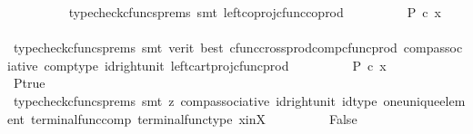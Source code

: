 \begin{isabellebody}
\ \ \ \ \ \ \ \ \isamarkupfalse%
\ {\isacharparenleft}{\kern0pt}typecheck{\isacharunderscore}{\kern0pt}cfuncs{\isacharunderscore}{\kern0pt}prems{\isacharcomma}{\kern0pt}\ smt\ left{\isacharunderscore}{\kern0pt}coproj{\isacharunderscore}{\kern0pt}cfunc{\isacharunderscore}{\kern0pt}coprod{\isacharparenright}{\kern0pt}\isanewline
\ \ \ \ \ \ \isamarkupfalse%
\ \isamarkupfalse%
\ {\isachardoublequoteopen}P\ {\isasymcirc}\isactrlsub c\ x\ {\isacharequal}{\kern0pt}\ {\isasymf}{\isachardoublequoteclose}\isanewline
\ \ \ \ \ \ \ \ \isamarkupfalse%
\ {\isacharparenleft}{\kern0pt}typecheck{\isacharunderscore}{\kern0pt}cfuncs{\isacharunderscore}{\kern0pt}prems{\isacharcomma}{\kern0pt}\ smt\ {\isacharparenleft}{\kern0pt}verit{\isacharcomma}{\kern0pt}\ best{\isacharparenright}{\kern0pt}\ cfunc{\isacharunderscore}{\kern0pt}cross{\isacharunderscore}{\kern0pt}prod{\isacharunderscore}{\kern0pt}comp{\isacharunderscore}{\kern0pt}cfunc{\isacharunderscore}{\kern0pt}prod\ comp{\isacharunderscore}{\kern0pt}associative{}\ comp{\isacharunderscore}{\kern0pt}type\ id{\isacharunderscore}{\kern0pt}right{\isacharunderscore}{\kern0pt}unit{}\ left{\isacharunderscore}{\kern0pt}cart{\isacharunderscore}{\kern0pt}proj{\isacharunderscore}{\kern0pt}cfunc{\isacharunderscore}{\kern0pt}prod{\isacharparenright}{\kern0pt}\isanewline
\ \ \ \ \ \ \isamarkupfalse%
\ \isamarkupfalse%
\ {\isachardoublequoteopen}P\ {\isasymcirc}\isactrlsub c\ x\ {\isacharequal}{\kern0pt}\ {\isasymt}{\isachardoublequoteclose}\isanewline
\ \ \ \ \ \ \ \ \isamarkupfalse%
\ P{\isacharunderscore}{\kern0pt}true\ \isamarkupfalse%
\ {\isacharparenleft}{\kern0pt}typecheck{\isacharunderscore}{\kern0pt}cfuncs{\isacharunderscore}{\kern0pt}prems{\isacharcomma}{\kern0pt}\ smt\ {\isacharparenleft}{\kern0pt}z{}{\isacharparenright}{\kern0pt}\ comp{\isacharunderscore}{\kern0pt}associative{}\ id{\isacharunderscore}{\kern0pt}right{\isacharunderscore}{\kern0pt}unit{}\ id{\isacharunderscore}{\kern0pt}type\ one{\isacharunderscore}{\kern0pt}unique{\isacharunderscore}{\kern0pt}element\ terminal{\isacharunderscore}{\kern0pt}func{\isacharunderscore}{\kern0pt}comp\ terminal{\isacharunderscore}{\kern0pt}func{\isacharunderscore}{\kern0pt}type\ x{\isacharunderscore}{\kern0pt}in{\isacharunderscore}{\kern0pt}X{\isacharparenright}{\kern0pt}\isanewline
\ \ \ \ \ \ \isamarkupfalse%
\ \isamarkupfalse%
\ False\isanewline
\ \ \ \ \ \ \ \ \isamarkupfalse%

\end{isabellebody}
